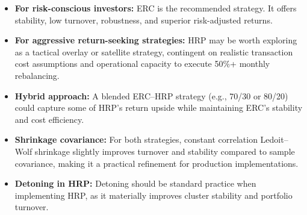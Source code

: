 \begin{itemize}
    \item \textbf{For risk-conscious investors:} ERC is the recommended strategy. It offers stability, low turnover, robustness, and superior risk-adjusted returns.
    
    \item \textbf{For aggressive return-seeking strategies:} HRP may be worth exploring as a tactical overlay or satellite strategy, contingent on realistic transaction cost assumptions and operational capacity to execute 50\%+ monthly rebalancing.
    
    \item \textbf{Hybrid approach:} A blended ERC--HRP strategy (e.g., 70/30 or 80/20) could capture some of HRP's return upside while maintaining ERC's stability and cost efficiency.
    
    \item \textbf{Shrinkage covariance:} For both strategies, constant correlation Ledoit--Wolf shrinkage slightly improves turnover and stability compared to sample covariance, making it a practical refinement for production implementations.
    
    \item \textbf{Detoning in HRP:} Detoning should be standard practice when implementing HRP, as it materially improves cluster stability and portfolio turnover.
\end{itemize}

